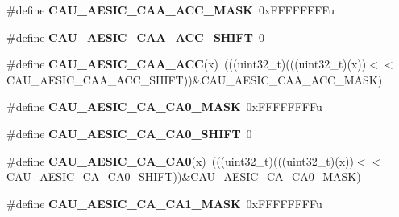 \begin{DoxyCompactItemize}
\item 
\#define {\bfseries C\+A\+U\+\_\+\+A\+E\+S\+I\+C\+\_\+\+C\+A\+A\+\_\+\+A\+C\+C\+\_\+\+M\+A\+SK}~0x\+F\+F\+F\+F\+F\+F\+F\+Fu\hypertarget{group__CAU__Register__Masks_ga6a186e09605a44795ee98614428823a0}{}\label{group__CAU__Register__Masks_ga6a186e09605a44795ee98614428823a0}

\item 
\#define {\bfseries C\+A\+U\+\_\+\+A\+E\+S\+I\+C\+\_\+\+C\+A\+A\+\_\+\+A\+C\+C\+\_\+\+S\+H\+I\+FT}~0\hypertarget{group__CAU__Register__Masks_gaac1b5dee501da2ddedcc86c0a91246f4}{}\label{group__CAU__Register__Masks_gaac1b5dee501da2ddedcc86c0a91246f4}

\item 
\#define {\bfseries C\+A\+U\+\_\+\+A\+E\+S\+I\+C\+\_\+\+C\+A\+A\+\_\+\+A\+CC}(x)~(((uint32\+\_\+t)(((uint32\+\_\+t)(x))$<$$<$C\+A\+U\+\_\+\+A\+E\+S\+I\+C\+\_\+\+C\+A\+A\+\_\+\+A\+C\+C\+\_\+\+S\+H\+I\+FT))\&C\+A\+U\+\_\+\+A\+E\+S\+I\+C\+\_\+\+C\+A\+A\+\_\+\+A\+C\+C\+\_\+\+M\+A\+SK)\hypertarget{group__CAU__Register__Masks_gac34a260005f2ff88c44b04865363e794}{}\label{group__CAU__Register__Masks_gac34a260005f2ff88c44b04865363e794}

\item 
\#define {\bfseries C\+A\+U\+\_\+\+A\+E\+S\+I\+C\+\_\+\+C\+A\+\_\+\+C\+A0\+\_\+\+M\+A\+SK}~0x\+F\+F\+F\+F\+F\+F\+F\+Fu\hypertarget{group__CAU__Register__Masks_gaf4f3bf1111180d2452151c2c954968ff}{}\label{group__CAU__Register__Masks_gaf4f3bf1111180d2452151c2c954968ff}

\item 
\#define {\bfseries C\+A\+U\+\_\+\+A\+E\+S\+I\+C\+\_\+\+C\+A\+\_\+\+C\+A0\+\_\+\+S\+H\+I\+FT}~0\hypertarget{group__CAU__Register__Masks_gab82f969160eac7bf345cc29560bf2a0a}{}\label{group__CAU__Register__Masks_gab82f969160eac7bf345cc29560bf2a0a}

\item 
\#define {\bfseries C\+A\+U\+\_\+\+A\+E\+S\+I\+C\+\_\+\+C\+A\+\_\+\+C\+A0}(x)~(((uint32\+\_\+t)(((uint32\+\_\+t)(x))$<$$<$C\+A\+U\+\_\+\+A\+E\+S\+I\+C\+\_\+\+C\+A\+\_\+\+C\+A0\+\_\+\+S\+H\+I\+FT))\&C\+A\+U\+\_\+\+A\+E\+S\+I\+C\+\_\+\+C\+A\+\_\+\+C\+A0\+\_\+\+M\+A\+SK)\hypertarget{group__CAU__Register__Masks_gab75a178dc0778fcd48c2287d288ed5c2}{}\label{group__CAU__Register__Masks_gab75a178dc0778fcd48c2287d288ed5c2}

\item 
\#define {\bfseries C\+A\+U\+\_\+\+A\+E\+S\+I\+C\+\_\+\+C\+A\+\_\+\+C\+A1\+\_\+\+M\+A\+SK}~0x\+F\+F\+F\+F\+F\+F\+F\+Fu\hypertarget{group__CAU__Register__Masks_gace8bbcda7b100e6febb77206a0b294ca}{}\label{group__CAU__Register__Masks_gace8bbcda7b100e6febb77206a0b294ca}


\end{DoxyCompactItemize}
